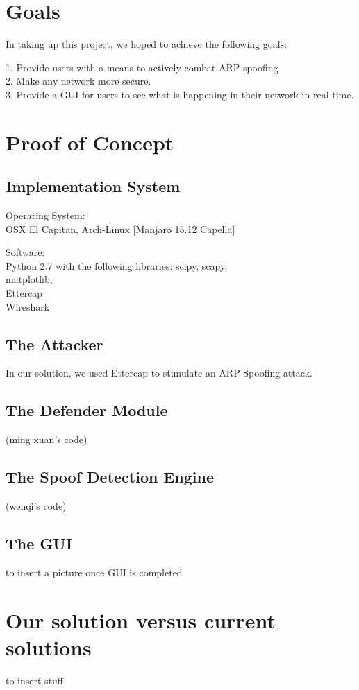 \documentclass{acm_proc_article-sp}
\begin{document}
\section{Goals}
In taking up this project, we hoped to achieve the following goals: 

1. Provide users with a means to actively combat ARP spoofing \\
2. Make any network more secure. \\
3. Provide a GUI for users to see what is happening in their network in real-time. 

\section{Proof of Concept}
\subsection{Implementation System}
Operating System: \\
OSX El Capitan, Arch-Linux [Manjaro 15.12 Capella]

Software: \\
Python 2.7 with the following libraries: scipy, scapy, \\matplotlib, \\ Ettercap \\ Wireshark
\subsection{The Attacker}
In our solution, we used Ettercap to stimulate an ARP Spoofing attack. 

\subsection{The Defender Module}

(ming xuan's code) 

\subsection{The Spoof Detection Engine}

(wenqi's code)

\subsection{The GUI}

to insert a picture once GUI is completed

\section{Our solution versus current \\solutions}
to insert stuff 
\end{document}
